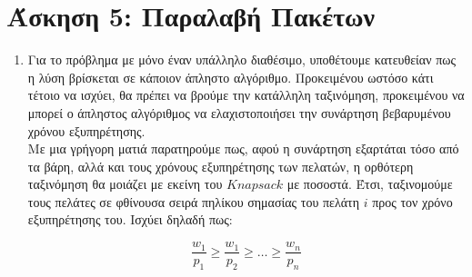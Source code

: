 \documentclass{article}
\begin{document}
\section*{\large Άσκηση 5: Παραλαβή Πακέτων}
\begin{enumerate}
	\item Για το πρόβλημα με μόνο έναν υπάλληλο διαθέσιμο, υποθέτουμε κατευθείαν πως η λύση βρίσκεται σε κάποιον άπληστο αλγόριθμο. Προκειμένου ωστόσο κάτι τέτοιο να ισχύει, θα πρέπει να βρούμε την κατάλληλη ταξινόμηση, προκειμένου να μπορεί ο άπληστος αλγόριθμος να ελαχιστοποιήσει την συνάρτηση βεβαρυμένου χρόνου εξυπηρέτησης. 
\\ Με μια γρήγορη ματιά παρατηρούμε πως, αφού η συνάρτηση εξαρτάται τόσο από τα βάρη, αλλά και τους χρόνους εξυπηρέτησης των πελατών, η ορθότερη ταξινόμηση θα μοιάζει με εκείνη του $Knapsack$ με ποσοστά. Έτσι, ταξινομούμε τους πελάτες σε φθίνουσα σειρά πηλίκου σημασίας του πελάτη $i$ προς τον χρόνο εξυπηρέτησης του. Ισχύει δηλαδή πως: 

$$
\frac{w_1}{p_1} \geq \frac{w_1}{p_2} \geq \ldots \geq \frac{w_n}{p_n}
$$


\end{enumerate}
\end{document}
